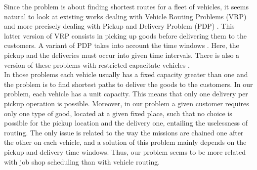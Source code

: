 \documentclass[a4paper,10pt]{article}
\begin{document}

Since the problem is about finding shortest routes for a fleet of vehicles, it seems natural to look at existing works dealing with Vehicle Routing Problems (VRP) \cite{Toth2001,Laporte1992} and more precisely dealing with Pickup and Delivery Problem (PDP) \cite{Berbeglia2007}. This latter version of VRP consists in picking up goods before delivering them to the customers. A variant of PDP takes into account the time windows \cite{Mitrovic1998}. Here, the pickup and the deliveries must occur into given time intervals. There is also a version of these problems with restricted capacitate vehicles \cite{Toth2001}. \\

In those problems each vehicle usually has a fixed capacity greater than one and the problem is to find shortest paths to deliver the goods to the customers. In our problem, each vehicle has a unit capacity. This means that only one delivery per pickup operation is possible. Moreover, in our problem a given customer requires only one type of good, located at a given fixed place, such that no choice is possible for the pickup location and the delivery one, entailing the uselessness of routing. The only issue is related to the way the missions are chained one after the other on each vehicle, and a solution of this problem mainly depends on the pickup and delivery time windows. Thus, our problem seems to be more related with job shop scheduling than with vehicle routing.\\



\end{document}
